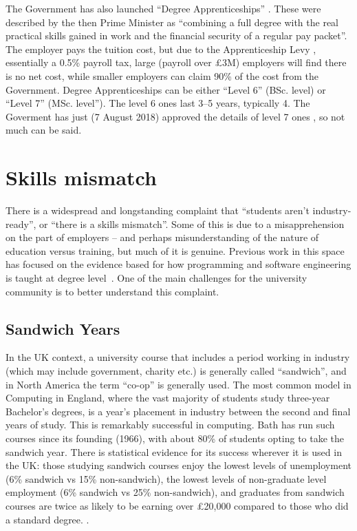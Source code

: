 \documentclass[sigconf]{acmart}
\begin{document}
The Government has also launched ``Degree Apprenticeships''
\cite{BIS2015a}. These were described by the then Prime Minister as
``combining a full degree with the real practical skills gained in
work and the financial security of a regular pay packet''. The
employer pays the tuition cost, but due to the Apprenticeship Levy%
, essentially a 0.5\% payroll tax, large (payroll over \pounds3M) employers will find there is no net cost, while smaller employers can claim 90\% of the cost from the Government.  
Degree Apprenticeships can be either ``Level 6'' (BSc. level) or ``Level 7'' (MSc. level''). The level 6 ones last 3--5 years, typically 4. 
The Goverment has just (7 August 2018) approved the details of level 7 ones%
, so not much can be said.

\section{Skills mismatch}\label{sec:Skills}

There is a widespread and longstanding complaint that ``students
aren't industry-ready'', or ``there is a skills mismatch''. Some of
this is due to a misapprehension on the part of employers -- and
perhaps misunderstanding of the nature of education versus training,
but much of it is genuine. Previous work in this space has
focused on the evidence based for how programming and software
engineering is taught at degree
level~\cite{davenport-et-al:latice2016,murphy-et-al:programming2017,simon-et-al:sigcse2018}. One
of the main challenges for the university community is to better
understand this complaint.

\subsection{Sandwich Years}

In the UK context, a university course that includes a period working
in industry (which may include government, charity etc.) is generally
called ``sandwich'', and in North America the term ``co-op'' is
generally used. The most common model in Computing in England, where
the vast majority of students study three-year Bachelor's degrees, is
a year's placement in industry between the second and final years of
study. This is remarkably successful in computing.  %
Bath has run such courses since its founding (1966), with about 80\%
of students opting to take the sandwich year.  There is statistical
evidence for its success wherever it is used in the UK: those studying
sandwich courses enjoy the lowest levels of unemployment (6\% sandwich
vs 15\% non-sandwich), the lowest levels of non-graduate level
employment (6\% sandwich vs 25\% non-sandwich), and graduates from
sandwich courses are twice as likely to be earning over \pounds20,000
compared to those who did a standard
degree. \cite[\P2.5]{Shadbolt2016a}.
\end{document}
